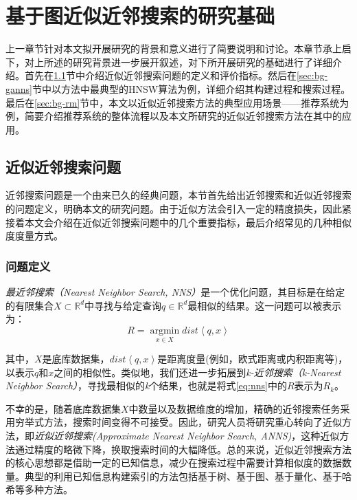 \renewcommand{\algorithmicrequire}{\textbf{输入：}\unskip}
\renewcommand{\algorithmicensure}{\textbf{输出：}\unskip}

\chapter{基于图近似近邻搜索的研究基础}
上一章节针对本文拟开展研究的背景和意义进行了简要说明和讨论。本章节承上启下，对上所述的研究背景进一步展开叙述，对下所开展研究的基础进行了详细介绍。首先在\ref{sec:bg-anns}节中介绍近似近邻搜索问题的定义和评价指标。然后在\ref{sec:bg-ganns}节中以\ganns 方法中最典型的HNSW算法为例，详细介绍其构建过程和搜索过程。最后在\ref{sec:bg-rm}节中，本文以近似近邻搜索方法的典型应用场景——推荐系统为例，简要介绍推荐系统的整体流程以及本文所研究的近似近邻搜索方法在其中的应用。


\section{近似近邻搜索问题}\label{sec:bg-anns}
近邻搜索问题是一个由来已久的经典问题，本节首先给出近邻搜索和近似近邻搜索的问题定义，明确本文的研究问题。由于近似方法会引入一定的精度损失，因此紧接着本文会介绍在近似近邻搜索问题中的几个重要指标，最后介绍常见的几种相似度度量方式。

\subsection{问题定义}
\textit{最近邻搜索（Nearest Neighbor Search, NNS）}是一个优化问题，其目标是在给定的有限集合$X \subset \mathbb{R}^d $中寻找与给定查询$q \in \mathbb{R}^d$最相似的结果。这一问题可以被表示为：
\begin{equation}
R = \mathop{\arg\min}\limits_{x \in X} dist \left\langle q,x \right\rangle 
\label{eq:nns}
\end{equation}

其中，$X$是底库数据集，$dist \left \langle q,x \right \rangle$是距离度量(例如，欧式距离或内积距离等)，以表示$q$和$x$之间的相似性。类似地，我们还进一步拓展到\textit{k-近邻搜索（k-Nearest Neighbor Search）}，寻找最相似的\textit{k}个结果，也就是将式\ref{eq:nns}中的$R$表示为$R_k$。

不幸的是，随着底库数据集$X$中数量以及数据维度的增加，精确的近邻搜索任务采用穷举式方法，搜索时间变得不可接受。因此，研究人员将研究重心转向了近似方法，即\textit{近似近邻搜索(Approximate Nearest Neighbor Search, ANNS)}，这种近似方法通过精度的略微下降，换取搜索时间的大幅降低。总的来说，近似近邻搜索方法的核心思想都是借助一定的已知信息，减少在搜索过程中需要计算相似度的数据数量。典型的利用已知信息构建索引的方法包括基于树、基于图、基于量化、基于哈希等多种方法。

